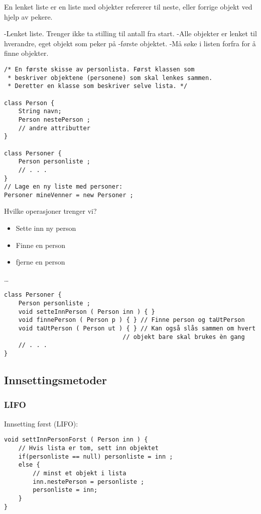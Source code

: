 \documentclass[11pt]{article}
\begin{document}
En lenket liste er en liste med objekter refererer til neste, eller forrige objekt ved hjelp av pekere.

-Lenket liste. Trenger ikke ta stilling til antall fra start.
-Alle objekter er lenket til hverandre, eget objekt som peker på
-første objektet.
-Må søke i listen forfra for å finne objekter.


\begin{verbatim}
/* En første skisse av personlista. Først klassen som
 * beskriver objektene (personene) som skal lenkes sammen.
 * Deretter en klasse som beskriver selve lista. */

class Person {
    String navn;
    Person nestePerson ;
    // andre attributter
}

class Personer {
    Person personliste ;
    // . . .
}
// Lage en ny liste med personer:
Personer mineVenner = new Personer ;
\end{verbatim}

Hvilke operasjoner trenger vi?
\begin{itemize}
\item Sette inn ny person
\item Finne en person
\item fjerne en person
\end{itemize}

\ldots{}

\begin{verbatim}
class Personer {
    Person personliste ;
    void setteInnPerson ( Person inn ) { }
    void finnePerson ( Person p ) { } // Finne person og taUtPerson
    void taUtPerson ( Person ut ) { } // Kan også slås sammen om hvert 
                                 // objekt bare skal brukes èn gang
    // . . .
}
\end{verbatim}
\subsection{Innsettingsmetoder}
\label{sec-8_2}
\subsubsection{LIFO}
\label{sec-8_2_1}

Innsetting først (LIFO):

\begin{verbatim}
void settInnPersonForst ( Person inn ) {
    // Hvis lista er tom, sett inn objektet
    if(personliste == null) personliste = inn ;
    else {
        // minst et objekt i lista
        inn.nestePerson = personliste ;
        personliste = inn;
    }
}
\end{verbatim}
\end{document}
